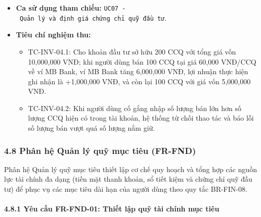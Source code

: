\documentclass[11pt,a4paper]{article}
\providecommand{\tightlist}{
  \setlength{\itemsep}{0pt}\setlength{\parskip}{0pt}}
\begin{document}
\begin{itemize}
  \begin{itemize}
  \tightlist
  \item
    Số tiền bán \(Proceeds\) được ghi có vào ví nhận tiền.
  \item
    Số lượng CCQ và vốn gốc còn lại của khoản đầu tư được cập nhật.
  \item
    Giá trị lợi nhuận/thua lỗ thực tế được ghi nhận vào sổ cái.
  \item
    Thông báo hoàn tất giao dịch bán chứng chỉ quỹ.
  \end{itemize}
\item
  \textbf{Ca sử dụng tham chiếu:}
  \texttt{UC07\ -\ Quản\ lý\ và\ định\ giá\ chứng\ chỉ\ quỹ\ đầu\ tư}.
\item
  \textbf{Tiêu chí nghiệm thu:}

  \begin{itemize}
  \tightlist
  \item
    TC-INV-04.1: Cho khoản đầu tư sở hữu 200 CCQ với tổng giá vốn
    10,000,000 VNĐ; khi người dùng bán 100 CCQ tại giá 60,000 VNĐ/CCQ về
    ví MB Bank, ví MB Bank tăng 6,000,000 VNĐ, lợi nhuận thực hiện ghi
    nhận là +1,000,000 VNĐ, và còn lại 100 CCQ với giá vốn 5,000,000
    VNĐ.
  \item
    TC-INV-04.2: Khi người dùng cố gắng nhập số lượng bán lớn hơn số
    lượng CCQ hiện có trong tài khoản, hệ thống từ chối thao tác và báo
    lỗi số lượng bán vượt quá số lượng nắm giữ.
  \end{itemize}
\end{itemize}

\subsubsection{4.8 Phân hệ Quản lý quỹ mục tiêu
(FR-FND)}\label{48-phuxe2n-hux1ec7-quux1ea3n-luxfd-quux1ef9-mux1ee5c-tiuxeau-fr-fnd}

Phân hệ Quản lý quỹ mục tiêu thiết lập cơ chế quy hoạch và tổng hợp các
nguồn lực tài chính đa dạng (tiền mặt thanh khoản, sổ tiết kiệm và chứng
chỉ quỹ đầu tư) để phục vụ các mục tiêu dài hạn của người dùng theo quy
tắc BR-FIN-08.

\paragraph{4.8.1 Yêu cầu FR-FND-01: Thiết lập quỹ tài chính mục
tiêu}\label{481-yuxeau-cux1ea7u-fr-fnd-01-thiux1ebft-lux1eadp-quux1ef9-tuxe0i-chuxednh-mux1ee5c-tiuxeau}
\end{document}
